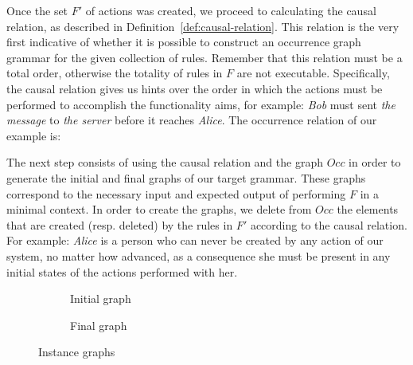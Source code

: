 Once the set $F'$ of actions was created, we proceed to calculating the causal relation, as described in Definition~\ref{def:causal-relation}. This relation is the very first indicative of whether it is possible to construct an occurrence graph grammar for the given collection of rules. Remember that this relation must be a total order, otherwise the totality of rules in $F$ are not executable. Specifically, the causal relation gives us hints over the order in which the actions must be performed to accomplish the functionality aims, for example: \textit{Bob} must sent \textit{the message} to \textit{the server} before it reaches \textit{Alice}. The occurrence relation of our example is:

\begin{intuition}
\end{intuition}

The next step consists of using the causal relation and the graph $Occ$ in order to generate the initial and final graphs of our target grammar. These graphs correspond to the necessary input and expected output of performing $F$ in a minimal context. In order to create the graphs, we delete from $Occ$ the elements that are created (resp. deleted) by the rules in $F'$ according to the causal relation. For example: \textit{Alice} is a person who can never be created by any action of our system, no matter how
advanced, as a consequence she must be present in any initial states of the actions performed with her.

\begin{figure}[!ht]
  \centering
  \begin{subfigure}[t]{.5\textwidth}
    \centerline{}
    \caption{Initial graph}
  \end{subfigure}%
  \begin{subfigure}[t]{.5\textwidth}
    \centerline{}
    \caption{Final graph}
  \end{subfigure}
  \caption{Instance graphs}\label{fig:tests:graphs}
\end{figure}

